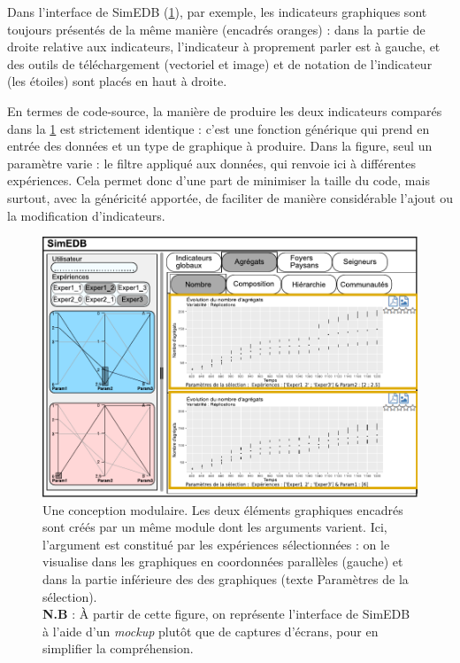 Dans l'interface de SimEDB (\cref{fig:simedb-modules}), par exemple, les indicateurs graphiques sont toujours présentés de la même manière (encadrés oranges) : dans la partie de droite relative aux indicateurs, l'indicateur à proprement parler est à gauche, et des outils de téléchargement (vectoriel et image) et de notation de l'indicateur (les étoiles) sont placés en haut à droite.

En termes de code-source, la manière de produire les deux indicateurs comparés dans la \cref{fig:simedb-modules} est strictement identique : c'est une fonction générique qui prend en entrée des données et un type de graphique à produire.
Dans la figure, seul un paramètre varie : le filtre appliqué aux données, qui renvoie ici à différentes expériences.
Cela permet donc d'une part de minimiser la taille du code, mais surtout, avec la généricité apportée, de faciliter de manière considérable l'ajout ou la modification d'indicateurs.

\begin{figure}[H]
	\centering
	\includegraphics[width=\linewidth]{img/mockup_SimEDB_modules.pdf}
	\caption{Une conception modulaire. Les deux éléments graphiques encadrés sont créés par un même \og module\fg{} dont les arguments varient.
		Ici, l'argument est constitué par les expériences sélectionnées : on le visualise dans les graphiques en coordonnées parallèles (gauche) et dans la partie inférieure des des graphiques (texte \og Paramètres de la sélection\fg{}).\\
		\textbf{N.B} : À partir de cette figure, on représente l'interface de SimEDB à l'aide d'un \textit{mockup} plutôt que de captures d'écrans, pour en simplifier la compréhension.}
	\label{fig:simedb-modules}
\end{figure}


